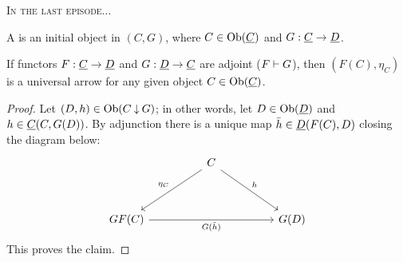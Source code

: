
\textsc{In the last episode...}

\begin{definition*}
	A  is an initial object in \( (C \comma G) \), where \( C \in \operatorname{Ob}(\underline{C}) \) and \( G: \underline{C} \to \underline{D} \).
\end{definition*}

\begin{lemma*}
	If functors \( F: \underline{C} \to \underline{D} \) and \( G: \underline{D} \to \underline{C} \) are adjoint (\( F \mathrel{\vdash} G \)), then \( (F(C), \eta_C) \) is a universal arrow for any given object \( C \in \operatorname{Ob}(\underline{C}) \).
\end{lemma*}
\begin{proof}
	Let \( (D, h) \in \operatorname{Ob}(C \mathbin{\downarrow} G) \); in other words, let \( D \in \operatorname{Ob}(\underline{D}) \) and \( h \in \underline{C}(C, G(D)) \). By adjunction there is a unique map \( \bar{h} \in \underline{D}(F(C), D) \) closing the diagram below:
	\[
		\begin{tikzcd}
			&& C \\
			\\
			{GF(C)} &&&& {G(D)}
			\arrow["{\eta_C}"', from=1-3, to=3-1]
			\arrow["h", from=1-3, to=3-5]
			\arrow["{G(\bar{h})}"', from=3-1, to=3-5]
		\end{tikzcd}
	\]
	This proves the claim.
\end{proof}

